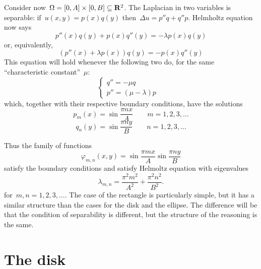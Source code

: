 Consider now~$\Omega=[0,A]\times[0,B]\subseteq\mathbf{R}^2$.
The Laplacian in two variables is separable: if~$u(x,y)=p(x)q(y)$
then~$\Delta u = p''q + q''p$.
Helmholtz equation now says
\[
	p''(x)q(y)+p(x)q''(y)=-\lambda p(x)q(y)
\]
or, equivalently,
\[
	\left(p''(x)+\lambda p(x)\right)q(y) = -p(x)q''(y)
\]
This equation will hold whenever the following two do, for the same
``characteristic constant''~$\mu$:
\[
	\begin{cases}
		q'' = -\mu q & \\
		p'' = (\mu-\lambda) p
	\end{cases}
\]
which, together with their respective boundary conditions, have the solutions
\[
	p_m(x) = \sin\frac{\pi n x}{A} \qquad m=1,2,3,\ldots
\]
\[
	q_n(y) = \sin\frac{\pi n y}{B} \qquad n=1,2,3,\ldots
\]

Thus the family of functions
\[
	\varphi_{m,n}(x,y)=\sin\frac{\pi m x}A\sin\frac{\pi n y}B
\]
satisfy the boundary conditions and satisfy Helmoltz equation with
eigenvalues
\[
	\lambda_{m,n} =
	\frac{\pi^2m^2}{A^2}
	+
	\frac{\pi^2n^2}{B^2}.
\]
for~$m,n=1,2,3,\ldots$.
The case of the rectangle is particularly simple, but it has a
similar
structure than the cases for the disk and the ellipse.
The difference will be that the condition of separability is
different, but the structure of the reasoning is the same.



\clearpage
\section{The disk}

